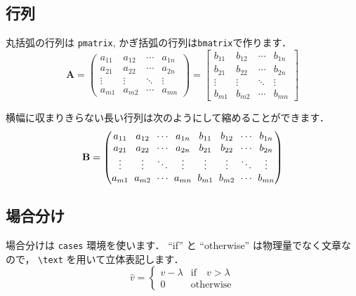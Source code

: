 \documentclass[dvipdfmx,report,disablejfam,nosetpagesize,12pt]{jsbook}
\begin{document}
\subsection{行列}
丸括弧の行列は \verb+pmatrix+, かぎ括弧の行列は\verb+bmatrix+で作ります．
\begin{equation}
   \mathbf{A} = 
   \begin{pmatrix}
      a_{11} & a_{12} & \cdots & a_{1n} \\
      a_{21} & a_{22} & \cdots & a_{2n} \\
      \vdots & \vdots & \ddots & \vdots \\
      a_{m1} & a_{m2} & \cdots & a_{mn}
   \end{pmatrix} =
   \begin{bmatrix}
      b_{11} & b_{12} & \cdots & b_{1n} \\
      b_{21} & b_{22} & \cdots & b_{2n} \\
      \vdots & \vdots & \ddots & \vdots \\
      b_{m1} & b_{m2} & \cdots & b_{mn}
   \end{bmatrix}
   \label{eq:pmatrix and bmatrix}
\end{equation}

横幅に収まりきらない長い行列は次のようにして縮めることができます．
\begin{equation}
   \setlength{\arraycolsep}{3pt}
   \mathbf{B} = 
   \begin{pmatrix}
      a_{11} & a_{12} & \cdots & a_{1n} & b_{11} & b_{12} & \cdots & b_{1n} \\
      a_{21} & a_{22} & \cdots & a_{2n} & b_{21} & b_{22} & \cdots & b_{2n} \\
      \vdots & \vdots & \ddots & \vdots & \vdots & \vdots & \ddots & \vdots \\
      a_{m1} & a_{m2} & \cdots & a_{mn} & b_{m1} & b_{m2} & \cdots & b_{mn}
   \end{pmatrix}
   \label{eq:matrix with narrow column spacing}
\end{equation}

\subsection{場合分け}
場合分けは \verb+cases+ 環境を使います． 
``if'' と ``otherwise'' は物理量でなく文章なので， \verb+\text+ を用いて立体表記します．
\begin{equation}
   \hat{v} = 
   \begin{cases}
      v - \lambda  & \text{if} \quad v > \lambda \\
      0            & \text{otherwise}
   \end{cases}
   \label{eq:cases environment}
\end{equation}
\end{document}
